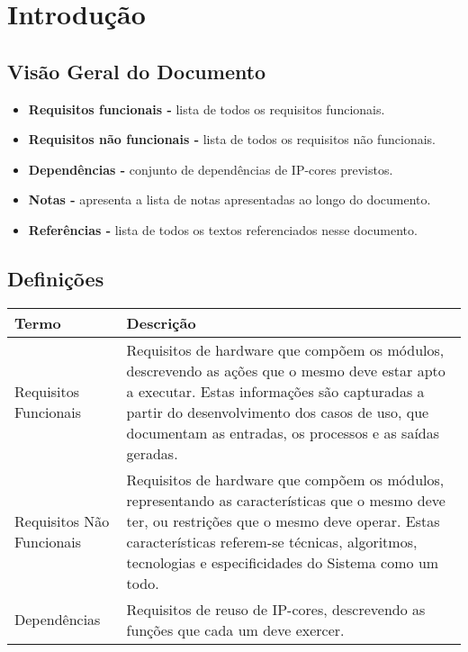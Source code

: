 \documentclass{article}
\begin{document}
\newpage

\tableofcontents
\newpage

\section{Introdução}

\subsection{Visão Geral do Documento}
  \begin{itemize}
   \item \textbf{Requisitos funcionais -} lista de todos os requisitos funcionais.
   \item \textbf{Requisitos não funcionais -} lista de todos os requisitos não funcionais.
   \item \textbf{Dependências -} conjunto de dependências de IP-cores previstos.
   \item \textbf{Notas -} apresenta a lista de notas apresentadas ao longo do documento.
   \item \textbf{Referências -} lista de todos os textos referenciados nesse documento.
  \end{itemize}

  \subsection{Definições}
    \FloatBarrier
    \begin{table}[H]
      \begin{center}
        \begin{tabular}[pos]{|m{5cm} | m{9cm}|}
          \hline
          \cellcolor[gray]{0.9}\textbf{Termo} & \cellcolor[gray]{0.9}\textbf{Descrição} \\ \hline
          Requisitos Funcionais & Requisitos de hardware que compõem os módulos, descrevendo as ações que o mesmo deve estar apto a executar. Estas informações são capturadas a partir do desenvolvimento dos casos de uso, que documentam as entradas, os processos e as saídas geradas.  \\ \hline
          Requisitos Não Funcionais & Requisitos de hardware que compõem os módulos, representando as características que o mesmo deve ter, ou restrições que o mesmo deve operar. Estas características referem-se técnicas, algoritmos, tecnologias e especificidades do Sistema como um todo.  \\ \hline
          Dependências & Requisitos de reuso de IP-cores, descrevendo as funções que cada um deve exercer. \\ \hline
        \end{tabular}
      \end{center}
    \end{table}
\end{document}
